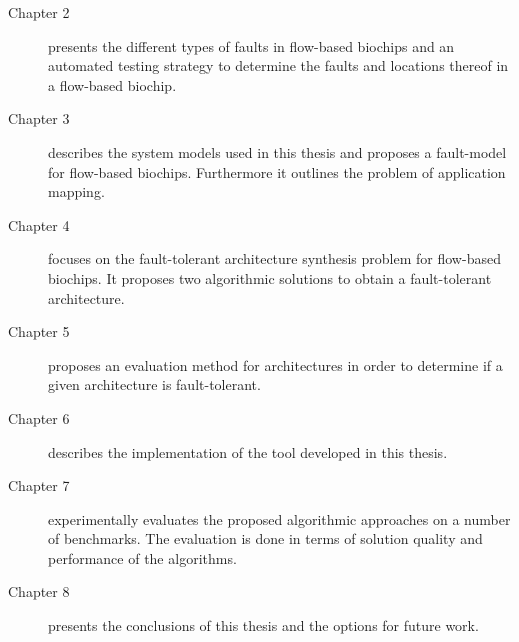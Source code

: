 \begin{description}
\item[Chapter 2] presents the different types of faults in flow-based biochips and an automated testing strategy to determine the faults and locations thereof in a flow-based biochip.

\item[Chapter 3] describes the system models used in this thesis and proposes a fault-model for flow-based biochips. Furthermore it outlines the problem of application mapping.

\item[Chapter 4] focuses on the fault-tolerant architecture synthesis problem for flow-based biochips. It proposes two algorithmic solutions to obtain a fault-tolerant architecture.

\item[Chapter 5] proposes an evaluation method for architectures in order to determine if a given architecture is fault-tolerant.

\item[Chapter 6] describes the implementation of the tool developed in this thesis.

\item[Chapter 7] experimentally evaluates the proposed algorithmic approaches on a number of benchmarks. The evaluation is done in terms of solution quality and performance of the algorithms.

\item[Chapter 8] presents the conclusions of this thesis and the options for future work.

\end{description}